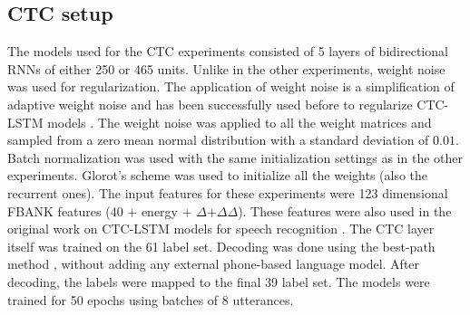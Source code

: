 \documentclass[journal]{IEEEtran}
\begin{document}
\subsection{CTC setup} \label{sec:ctc_setup}
The models used for the CTC experiments consisted of 5 layers of bidirectional RNNs of either 250 or 465 units. Unlike in the other experiments, weight noise was used for regularization. The application of weight noise is a simplification of adaptive weight noise \cite{graves2011practical} and has been successfully used before to regularize CTC-LSTM models \cite{graves2013speech}. The weight noise was applied to all the weight matrices and sampled from a zero mean normal distribution with a standard deviation of $0.01$. Batch normalization was used with the same initialization settings as in the other experiments. Glorot's scheme was used to initialize all the weights (also the recurrent ones). The input features for these experiments were 123 dimensional FBANK features (40 + energy + $\Delta$+$\Delta\Delta$). These features were also used in the original work on CTC-LSTM models for speech recognition \cite{graves2013speech}.
The CTC layer itself was trained on the 61 label set. Decoding was done using the best-path method \cite{CTC_graves}, without adding any external phone-based language model.
After decoding, the labels were mapped to the final 39 label set. The models were trained for 50 epochs using batches of 8 utterances. 

\end{document}
